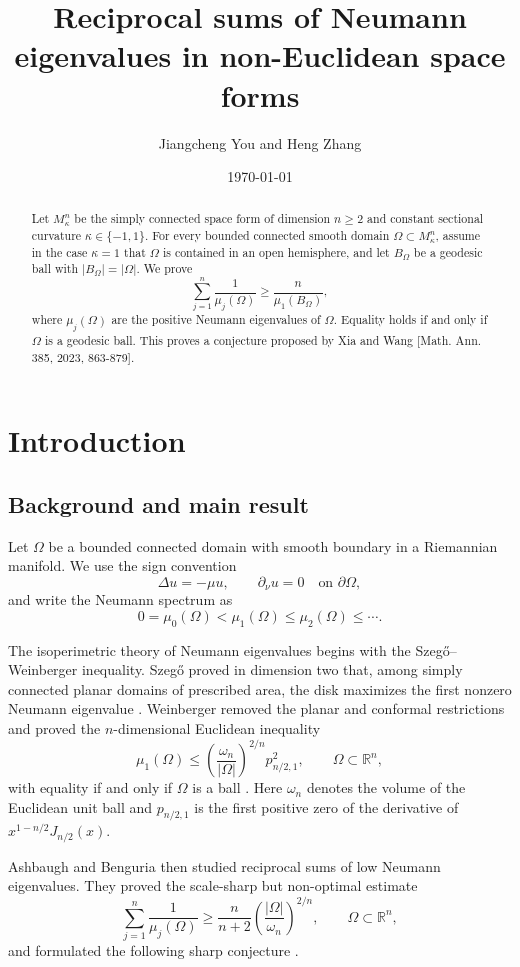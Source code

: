\documentclass[11pt]{amsart}
\title[Reciprocal sums]{Reciprocal sums of Neumann eigenvalues in non-Euclidean space forms}
\author{Jiangcheng You and Heng Zhang}
\date{\today}
\theoremstyle{remark}
\newcommand{\RR}{\mathbb R}
\begin{document}
\begin{abstract}
Let $M^n_\kappa$ be the simply connected space form of dimension $n\ge2$ and constant sectional curvature $\kappa\in\{-1,1\}$.  For every bounded connected smooth domain $\Omega\subset M^n_\kappa$, assume in the case $\kappa=1$ that $\Omega$ is contained in an open hemisphere, and let $B_\Omega$ be a geodesic ball with $|B_\Omega|=|\Omega|$.  We prove
$$
        \sum_{j=1}^n \frac1{\mu_j(\Omega)}\ge \frac{n}{\mu_1(B_\Omega)},
$$
where $\mu_j(\Omega)$ are the positive Neumann eigenvalues of $\Omega$.  Equality holds if and only if $\Omega$ is a geodesic ball.  This proves a conjecture proposed by Xia and Wang [Math. Ann. 385, 2023, 863-879].
\end{abstract}

\maketitle

\section{Introduction}
\subsection{Background and main result}
Let $\Omega$ be a bounded connected domain with smooth boundary in a Riemannian manifold.  We use the sign convention
$$
        \Delta u=-\mu u,
        \qquad
        \partial_\nu u=0 \quad \text{on }\partial\Omega,
$$
and write the Neumann spectrum as
$$
        0=\mu_0(\Omega)<\mu_1(\Omega)\le \mu_2(\Omega)\le\cdots .
$$


The isoperimetric theory of Neumann eigenvalues begins with the Szeg\H{o}--Weinberger inequality.  Szeg\H{o} proved in dimension two that, among simply connected planar domains of prescribed area, the disk maximizes the first nonzero Neumann eigenvalue \cite{Szego}.  Weinberger removed the planar and conformal restrictions and proved the $n$-dimensional Euclidean inequality
$$
        \mu_1(\Omega)
        \le \left(\frac{\omega_n}{|\Omega|}\right)^{2/n}p_{n/2,1}^2,
        \qquad \Omega\subset\RR^n,
$$
with equality if and only if $\Omega$ is a ball \cite{Weinberger}.  Here $\omega_n$ denotes the volume of the Euclidean unit ball and $p_{n/2,1}$ is the first positive zero of the derivative of $x^{1-n/2}J_{n/2}(x)$.

Ashbaugh and Benguria then studied reciprocal sums of low Neumann eigenvalues.  They proved the scale-sharp but non-optimal estimate
$$
        \sum_{j=1}^n\frac1{\mu_j(\Omega)}
        \ge \frac{n}{n+2}\left(\frac{|\Omega|}{\omega_n}\right)^{2/n},
        \qquad \Omega\subset\RR^n,
$$
and formulated the following sharp conjecture \cite{AB1993}.
\end{document}
